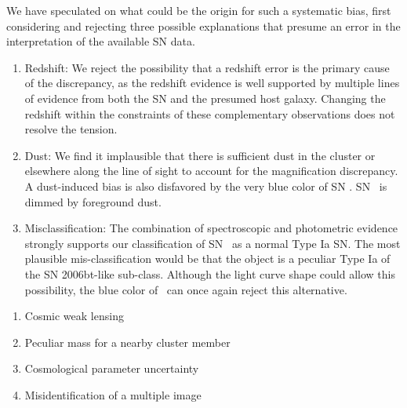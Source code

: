 We have speculated on what could be the origin for such a systematic bias,
first considering and rejecting three possible explanations that presume an error in the
interpretation of the available SN data. 

\begin{enumerate}
\item Redshift: We reject the possibility that a redshift error is the primary cause
of the discrepancy, as the redshift evidence is well supported by
multiple lines of evidence from both the SN and the presumed host
galaxy. Changing the redshift within the constraints of these
complementary observations does not resolve the tension. 
\item Dust: We find
it implausible that there is sufficient dust in the cluster or
elsewhere along the line of sight to account for the magnification
discrepancy.  A dust-induced bias is also disfavored by the very blue
color of SN \tomas. SN \tomas\ is dimmed by foreground dust.
\item Misclassification: The combination of spectroscopic and
photometric evidence strongly supports our classification of
SN \tomas\ as a normal Type Ia SN.  The most plausible
mis-classification would be that the object is a peculiar Type Ia of
the SN 2006bt-like sub-class.  Although the light curve shape could
allow this possibility, the blue color of \tomas\ can once again
reject this alternative. 
\end{enumerate}

\noindent 


\begin{enumerate}
\item Cosmic weak lensing 
\item Peculiar mass for a nearby cluster member
\item Cosmological parameter uncertainty
\item Misidentification of a multiple image
\end{enumerate}

\noindent
{}


